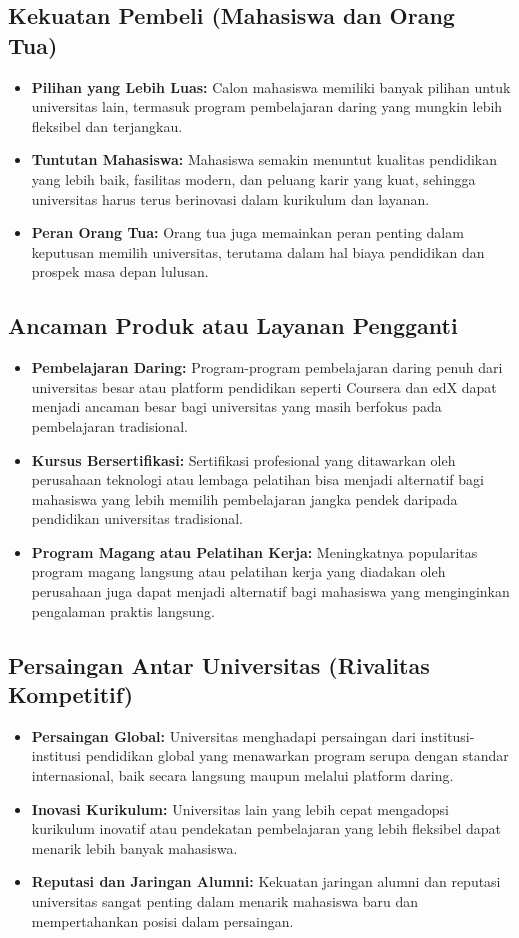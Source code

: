 \subsection{Kekuatan Pembeli (Mahasiswa dan Orang Tua)}
\begin{itemize}
	\item \textbf{Pilihan yang Lebih Luas:} Calon mahasiswa memiliki banyak pilihan untuk universitas lain, termasuk program pembelajaran daring yang mungkin lebih fleksibel dan terjangkau.
	\item \textbf{Tuntutan Mahasiswa:} Mahasiswa semakin menuntut kualitas pendidikan yang lebih baik, fasilitas modern, dan peluang karir yang kuat, sehingga universitas harus terus berinovasi dalam kurikulum dan layanan.
	\item \textbf{Peran Orang Tua:} Orang tua juga memainkan peran penting dalam keputusan memilih universitas, terutama dalam hal biaya pendidikan dan prospek masa depan lulusan.
\end{itemize}

\subsection{Ancaman Produk atau Layanan Pengganti}
\begin{itemize}
	\item \textbf{Pembelajaran Daring:} Program-program pembelajaran daring penuh dari universitas besar atau platform pendidikan seperti Coursera dan edX dapat menjadi ancaman besar bagi universitas yang masih berfokus pada pembelajaran tradisional.
	\item \textbf{Kursus Bersertifikasi:} Sertifikasi profesional yang ditawarkan oleh perusahaan teknologi atau lembaga pelatihan bisa menjadi alternatif bagi mahasiswa yang lebih memilih pembelajaran jangka pendek daripada pendidikan universitas tradisional.
	\item \textbf{Program Magang atau Pelatihan Kerja:} Meningkatnya popularitas program magang langsung atau pelatihan kerja yang diadakan oleh perusahaan juga dapat menjadi alternatif bagi mahasiswa yang menginginkan pengalaman praktis langsung.
\end{itemize}

\subsection{Persaingan Antar Universitas (Rivalitas Kompetitif)}
\begin{itemize}
	\item \textbf{Persaingan Global:} Universitas menghadapi persaingan dari institusi-institusi pendidikan global yang menawarkan program serupa dengan standar internasional, baik secara langsung maupun melalui platform daring.
	\item \textbf{Inovasi Kurikulum:} Universitas lain yang lebih cepat mengadopsi kurikulum inovatif atau pendekatan pembelajaran yang lebih fleksibel dapat menarik lebih banyak mahasiswa.
	\item \textbf{Reputasi dan Jaringan Alumni:} Kekuatan jaringan alumni dan reputasi universitas sangat penting dalam menarik mahasiswa baru dan mempertahankan posisi dalam persaingan.
\end{itemize}

